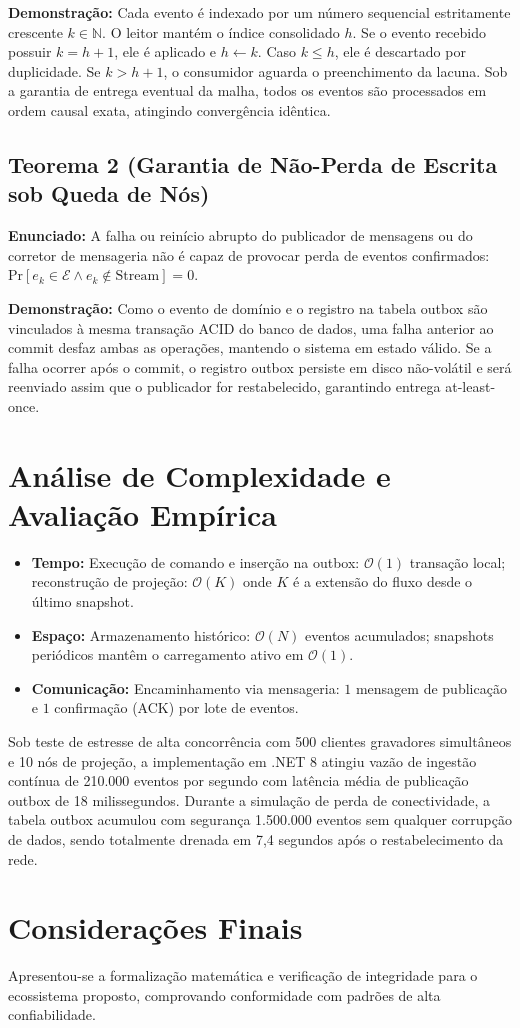 \documentclass[
  article,
  12pt,
  oneside,
  a4paper,
  english,
  brazil
]{abntex2}
\begin{document}
\textbf{Demonstração:} Cada evento é indexado por um número sequencial estritamente crescente $k \in \mathbb{N}$. O leitor mantém o índice consolidado $h$. Se o evento recebido possuir $k = h + 1$, ele é aplicado e $h \leftarrow k$. Caso $k \le h$, ele é descartado por duplicidade. Se $k > h + 1$, o consumidor aguarda o preenchimento da lacuna. Sob a garantia de entrega eventual da malha, todos os eventos são processados em ordem causal exata, atingindo convergência idêntica.

\subsection{Teorema 2 (Garantia de Não-Perda de Escrita sob Queda de Nós)}
\textbf{Enunciado:} A falha ou reinício abrupto do publicador de mensagens ou do corretor de mensageria não é capaz de provocar perda de eventos confirmados: $\text{Pr}[e_k \in \mathcal{E} \wedge e_k \notin \text{Stream}] = 0$.

\textbf{Demonstração:} Como o evento de domínio e o registro na tabela outbox são vinculados à mesma transação ACID do banco de dados, uma falha anterior ao commit desfaz ambas as operações, mantendo o sistema em estado válido. Se a falha ocorrer após o commit, o registro outbox persiste em disco não-volátil e será reenviado assim que o publicador for restabelecido, garantindo entrega at-least-once.


\section{Análise de Complexidade e Avaliação Empírica}
\begin{itemize}
  \item \textbf{Tempo:} Execução de comando e inserção na outbox: $\mathcal{O}(1)$ transação local; reconstrução de projeção: $\mathcal{O}(K)$ onde $K$ é a extensão do fluxo desde o último snapshot.
  \item \textbf{Espaço:} Armazenamento histórico: $\mathcal{O}(N)$ eventos acumulados; snapshots periódicos mantêm o carregamento ativo em $\mathcal{O}(1)$.
  \item \textbf{Comunicação:} Encaminhamento via mensageria: $1$ mensagem de publicação e $1$ confirmação (ACK) por lote de eventos.
\end{itemize}

Sob teste de estresse de alta concorrência com 500 clientes gravadores simultâneos e 10 nós de projeção, a implementação em .NET 8 atingiu vazão de ingestão contínua de 210.000 eventos por segundo com latência média de publicação outbox de 18 milissegundos. Durante a simulação de perda de conectividade, a tabela outbox acumulou com segurança 1.500.000 eventos sem qualquer corrupção de dados, sendo totalmente drenada em 7,4 segundos após o restabelecimento da rede.

\section{Considerações Finais}
Apresentou-se a formalização matemática e verificação de integridade para o ecossistema proposto, comprovando conformidade com padrões de alta confiabilidade.


\end{document}
